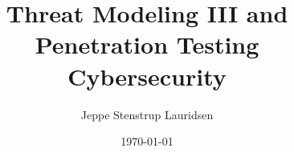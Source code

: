 \documentclass[12pt]{article}
\title{%
Threat Modeling III and Penetration Testing \\
\large Cybersecurity}
\author{Jeppe Stenstrup Lauridsen}
\date{\today}
\begin{document}
\begin{titlepage}
\clearpage\maketitle
\thispagestyle{empty}
\end{titlepage}





\end{document}
